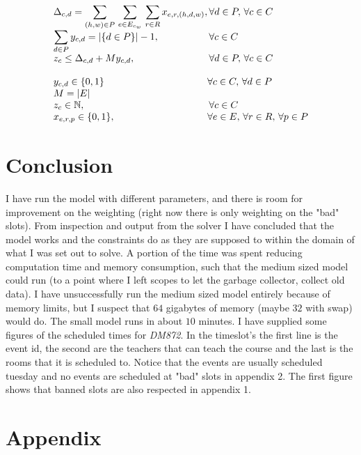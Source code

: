 \documentclass{article}
\begin{document}
\begin{equation*}
\begin{array}{ll@{}ll}
            & \displaystyle \Delta_{c,d} =  \sum_{(h,w) \in P} \, \sum_{e \in E_{c_w}} \,\sum_{r \in R}  x_{e,r,(h,d,w)}, & \, \forall d \in P, \, \forall c \in C\\
            & \displaystyle \sum_{d \in P} y_{c,d} = |\{d \in P\}| - 1 , & \, \forall c \in C\\
            & \displaystyle z_c \leq \Delta_{c,d} + M y_{c,d} , & \, \forall d \in P , \, \forall c \in C\\
            & &\\
            & y_{c,d} \in \{0, 1\} & \forall c \in C, \, \forall d \in P \\
            & M = |E| &\\
            & z_c \in \mathbb{N}, & \, \forall c \in C\\
            & x_{e,r,p} \in \{0,1\},&  \forall e \in E ,\, \forall r \in R ,\, \forall p \in P &
        \end{array}
    \end{equation*}

    \section{Conclusion}
    I have run the model with different parameters, and there is room for improvement on the weighting (right now there is only weighting on the "bad" slots).
    From inspection and output from the solver I have concluded that the model works and the constraints do as they are supposed to within the domain of what I was set out to solve.
    A portion of the time was spent reducing computation time and memory consumption, such that the medium sized model could run (to a point where I left scopes to let the garbage collector, collect old data).
    I have unsuccessfully run the medium sized model entirely because of memory limits, but I suspect that $64$ gigabytes of memory (maybe $32$ with swap) would do.
    The small model runs in about $10$ minutes.
    I have supplied some figures of the scheduled times for \textit{DM872}.
    In the timeslot's the first line is the event id, the second are the teachers that can teach the course and the last is the rooms that it is scheduled to.
    Notice that the events are usually scheduled tuesday and no events are scheduled at "bad" slots in appendix 2.
    The first figure shows that banned slots are also respected in appendix 1.

    \clearpage
    \section{Appendix}
\end{document}
